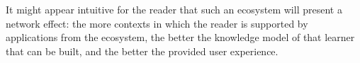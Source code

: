 It might appear intuitive for the reader that such an ecosystem will present a network effect: the more contexts in which the reader is supported by applications from the ecosystem, the better the knowledge model of that learner that can be built, and the better the provided user experience.




	


